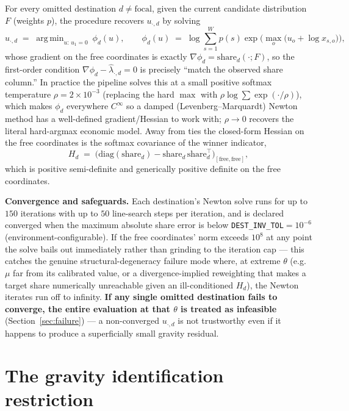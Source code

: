 \documentclass[11pt]{article}
\DeclareMathOperator*{\argmin}{arg\,min}
\begin{document}
For every omitted destination $d\neq\text{focal}$, given the current candidate distribution
$F$ (weights $p$), the procedure recovers $u_{\cdot,d}$ by solving
\[
\hat u_{\cdot,d} \;=\; \argmin_{u:\,u_1=0}\ \phi_d(u), \qquad
\phi_d(u) \;=\; \log\!\sum_{s=1}^{W} p(s)\exp\!\Big(\max_o\big(u_o + \log x_{s,o}\big)\Big),
\]
whose gradient on the free coordinates is exactly $\nabla\phi_d = \mathrm{share}_d(\cdot;F)$, so the
first-order condition $\nabla\phi_d - \hat\lambda_{\cdot,d} = 0$ is precisely ``match the observed
share column.'' In practice the pipeline solves this at a small positive softmax temperature
$\rho=2\times10^{-3}$ (replacing the hard $\max$ with $\rho\log\sum\exp(\cdot/\rho)$), which makes
$\phi_d$ everywhere $C^\infty$ so a damped (Levenberg--Marquardt) Newton method has a well-defined
gradient/Hessian to work with; $\rho\to0$ recovers the literal hard-argmax economic model. Away from
ties the closed-form Hessian on the free coordinates is the softmax covariance of the winner
indicator,
\[
H_d \;=\; \big(\mathrm{diag}(\mathrm{share}_d) - \mathrm{share}_d\,\mathrm{share}_d^\top\big)_{[\text{free},\text{free}]},
\]
which is positive semi-definite and generically positive definite on the free coordinates.

\textbf{Convergence and safeguards.} Each destination's Newton solve runs for up to $150$ iterations
with up to $50$ line-search steps per iteration, and is declared converged when the maximum absolute
share error is below \texttt{DEST\_INV\_TOL}$=10^{-6}$ (environment-configurable). If the free
coordinates' norm exceeds $10^{8}$ at any point the solve bails out immediately rather than grinding
to the iteration cap — this catches the genuine structural-degeneracy failure mode where, at extreme
$\theta$ (e.g.\ $\mu$ far from its calibrated value, or a divergence-implied reweighting that makes a
target share numerically unreachable given an ill-conditioned $H_d$), the Newton iterates run off to
infinity. \textbf{If any single omitted destination fails to converge, the entire evaluation at that
$\theta$ is treated as infeasible} (Section~\ref{sec:failure}) — a non-converged $u_{\cdot,d}$ is not
trustworthy even if it happens to produce a superficially small gravity residual.

\section{The gravity identification restriction}
\label{sec:gravity}
\end{document}
